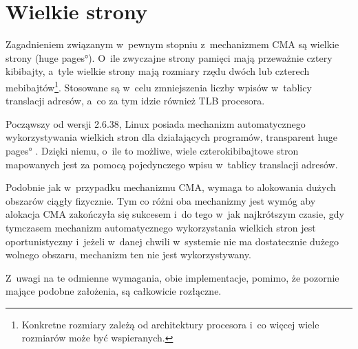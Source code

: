 \section{Wielkie strony}

Zagadnieniem związanym w~pewnym stopniu z~mechanizmem CMA są wielkie
strony (\ang{huge pages}).  O~ile zwyczajne strony pamięci mają
przeważnie cztery kibibajty, a~tyle wielkie strony mają rozmiary rzędu
dwóch lub czterech mebibajtów\footnote{Konkretne rozmiary zależą od
  architektury procesora i~co więcej wiele rozmiarów może być
  wspieranych.}.  Stosowane są w~celu zmniejszenia liczby wpisów
w~tablicy translacji adresów, a~co za tym idzie również TLB procesora.

Począwszy od wersji 2.6.38, Linux posiada mechanizm automatycznego
wykorzystywania wielkich stron dla działających programów,
\ang{transparent huge pages} \cite{bib:v2.6.38}.  Dzięki niemu,
o~ile to możliwe, wiele czterokibibajtowe stron mapowanych jest za
pomocą pojedynczego wpisu w~tablicy translacji adresów.

Podobnie jak w~przypadku mechanizmu CMA, wymaga to alokowania dużych
obszarów ciągły fizycznie.  Tym co różni oba mechanizmy jest wymóg aby
alokacja CMA zakończyła się sukcesem i~do tego w~jak najkrótszym
czasie, gdy tymczasem mechanizm automatycznego wykorzystania wielkich
stron jest oportunistyczny i~jeżeli w~danej chwili w~systemie nie ma
dostatecznie dużego wolnego obszaru, mechanizm ten nie jest
wykorzystywany.

Z~uwagi na te odmienne wymagania, obie implementacje, pomimo, że
pozornie mające podobne założenia, są całkowicie rozłączne.
